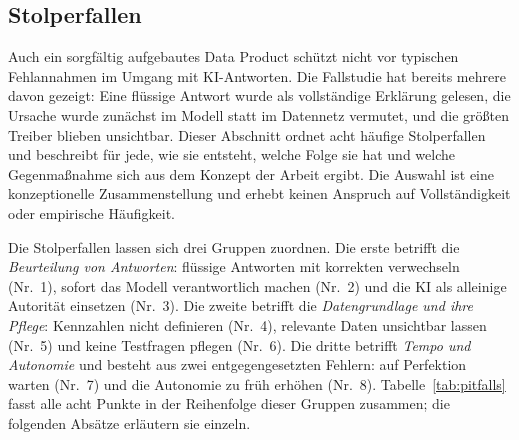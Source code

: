 \documentclass[a4paper,12pt]{article}
\theoremstyle{definition}
\begin{document}
\subsection{Stolperfallen}
\label{sec:pitfalls}

Auch ein sorgfältig aufgebautes Data Product schützt nicht vor typischen Fehlannahmen im Umgang mit KI-Antworten. Die Fallstudie hat bereits mehrere davon gezeigt: Eine flüssige Antwort wurde als vollständige Erklärung gelesen, die Ursache wurde zunächst im Modell statt im Datennetz vermutet, und die größten Treiber blieben unsichtbar. Dieser Abschnitt ordnet acht häufige Stolperfallen und beschreibt für jede, wie sie entsteht, welche Folge sie hat und welche Gegenmaßnahme sich aus dem Konzept der Arbeit ergibt. Die Auswahl ist eine konzeptionelle Zusammenstellung und erhebt keinen Anspruch auf Vollständigkeit oder empirische Häufigkeit.

Die Stolperfallen lassen sich drei Gruppen zuordnen. Die erste betrifft die \emph{Beurteilung von Antworten}: flüssige Antworten mit korrekten verwechseln (Nr.~1), sofort das Modell verantwortlich machen (Nr.~2) und die KI als alleinige Autorität einsetzen (Nr.~3). Die zweite betrifft die \emph{Datengrundlage und ihre Pflege}: Kennzahlen nicht definieren (Nr.~4), relevante Daten unsichtbar lassen (Nr.~5) und keine Testfragen pflegen (Nr.~6). Die dritte betrifft \emph{Tempo und Autonomie} und besteht aus zwei entgegengesetzten Fehlern: auf Perfektion warten (Nr.~7) und die Autonomie zu früh erhöhen (Nr.~8). Tabelle~\ref{tab:pitfalls} fasst alle acht Punkte in der Reihenfolge dieser Gruppen zusammen; die folgenden Absätze erläutern sie einzeln.
\end{document}
